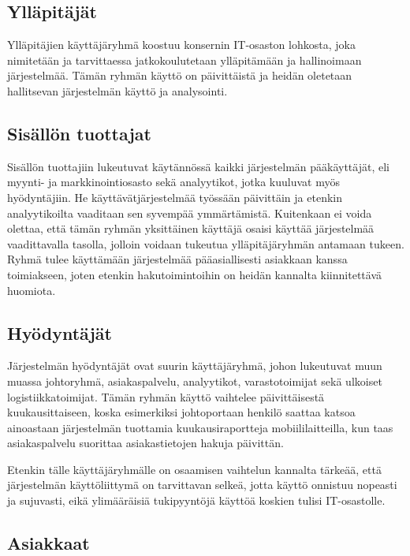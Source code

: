     \subsection{Ylläpitäjät}

        Ylläpitäjien käyttäjäryhmä koostuu konsernin IT-osaston lohkosta, joka nimitetään ja tarvittaessa jatkokoulutetaan ylläpitämään ja hallinoimaan 
        järjestelmää. Tämän ryhmän käyttö on päivittäistä ja heidän oletetaan hallitsevan järjestelmän käyttö ja analysointi.

    \subsection{Sisällön tuottajat}

        Sisällön tuottajiin lukeutuvat käytännössä kaikki järjestelmän pääkäyttäjät, eli myynti- ja markkinointiosasto sekä analyytikot, jotka kuuluvat 
        myös hyödyntäjiin. He käyttävätjärjestelmää työssään päivittäin ja etenkin analyytikoilta vaaditaan sen syvempää ymmärtämistä. Kuitenkaan ei
        voida olettaa, että tämän ryhmän yksittäinen käyttäjä osaisi käyttää järjestelmää vaadittavalla tasolla, jolloin voidaan tukeutua 
        ylläpitäjäryhmän antamaan tukeen. Ryhmä tulee käyttämään järjestelmää pääasiallisesti asiakkaan kanssa toimiakseen, joten etenkin hakutoimintoihin on heidän kannalta kiinnitettävä
        huomiota.

    \subsection{Hyödyntäjät}

        Järjestelmän hyödyntäjät ovat suurin käyttäjäryhmä, johon lukeutuvat muun muassa johtoryhmä, asiakaspalvelu, analyytikot, varastotoimijat sekä 
        ulkoiset logistiikkatoimijat. Tämän ryhmän käyttö vaihtelee päivittäisestä kuukausittaiseen, koska esimerkiksi johtoportaan henkilö saattaa katsoa 
        ainoastaan järjestelmän tuottamia kuukausiraportteja mobiililaitteilla, kun taas asiakaspalvelu suorittaa asiakastietojen hakuja päivittän.

        Etenkin tälle käyttäjäryhmälle on osaamisen vaihtelun kannalta tärkeää, että järjestelmän käyttöliittymä on tarvittavan selkeä, jotta 
        käyttö onnistuu nopeasti ja sujuvasti, eikä ylimääräisiä tukipyyntöjä käyttöä koskien tulisi IT-osastolle.

    \subsection{Asiakkaat}

